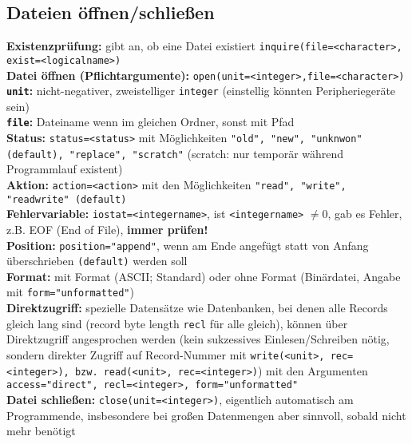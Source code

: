 \documentclass[a4paper, twocolumn]{scrarticle}
\begin{document}
\subsection{Dateien öffnen/schließen}\label{sec:dateien-oeffnen}
\textbf{Existenzprüfung:} gibt an, ob eine Datei existiert \lstinline|inquire(file=<character>, exist=<logicalname>)| \\
\textbf{Datei öffnen (Pflichtargumente):} \lstinline|open(unit=<integer>,file=<character>)|\\
\textbf{\lstinline|unit|:} nicht-negativer, zweistelliger \lstinline|integer| (einstellig könnten Peripheriegeräte sein)\\
\textbf{\lstinline|file|:} Dateiname wenn im gleichen Ordner, sonst mit Pfad\\
\textbf{Status:} \lstinline|status=<status>| mit Möglichkeiten \lstinline|"old", "new", "unknwon" (default), "replace", "scratch"| (scratch: nur temporär während Programmlauf existent)\\
\textbf{Aktion:} \lstinline|action=<action>| mit den Möglichkeiten \lstinline|"read", "write", "readwrite" (default)|\\
\textbf{Fehlervariable:} \lstinline|iostat=<integername>|, ist \lstinline|<integername>| $\neq 0$, gab es Fehler, z.B. EOF (End of File), \textbf{immer prüfen!}\\
\textbf{Position:} \lstinline|position="append"|, wenn am Ende angefügt statt von Anfang überschrieben \lstinline|(default)| werden soll\\
\textbf{Format:} mit Format (ASCII; Standard) oder ohne Format (Binärdatei, Angabe mit \lstinline|form="unformatted"|)\\
\textbf{Direktzugriff:} spezielle Datensätze wie Datenbanken, bei denen alle Records gleich lang sind (record byte length \lstinline|recl| für alle gleich), können über Direktzugriff angesprochen werden (kein sukzessives Einlesen/Schreiben nötig, sondern direkter Zugriff auf Record-Nummer mit \lstinline|write(<unit>, rec=<integer>), bzw. read(<unit>, rec=<integer>)|) mit den Argumenten \lstinline|access="direct", recl=<integer>, form="unformatted"|\\
\textbf{Datei schließen:} \lstinline|close(unit=<integer>)|, eigentlich automatisch am Programmende, insbesondere bei großen Datenmengen aber sinnvoll, sobald nicht mehr benötigt
\end{document}
